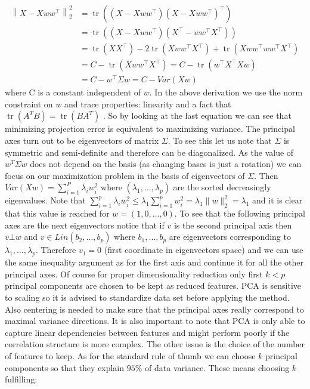 \documentclass[12pt, wide]{mwart}
\begin{document}
\begin{align*}
\left\|X-X w w^{\top}\right\|^{2}_2 &=\operatorname{tr}\left(\left(X-X w w^{\top}\right)\left(X-X w w^{\top}\right)^{\top}\right) \\ &=\operatorname{tr}\left(\left(X-X w w^{\top}\right)\left(X^{\top}-w w^{\top} X^{\top}\right)\right) \\ &=\operatorname{tr}\left(X X^{\top}\right)-2 \operatorname{tr}\left(X w w^{\top} X^{\top}\right)+\operatorname{tr}\left(X w w^{\top} w w^{\top} X^{\top}\right) \\ &=C-\operatorname{tr}\left(X w w^{\top} X^{\top}\right)=C-\operatorname{tr}\left(w^{\top} X^{\top} X w\right) \\ &=C-w^{\top} \Sigma w = C - Var(Xw)
\end{align*} where C is a constant independent of $w$. In the above derivation we use the norm constraint on $w$ and trace properties: linearity and a fact that $\operatorname{tr}\left(A^TB\right) = \operatorname{tr}\left(BA^T\right)$ . So by looking at the last equation we can see that minimizing projection error is equivalent to maximizing variance. The principal axes turn out to be eigenvectors of matrix $\Sigma$. To see this let us note that $\Sigma$ is symmetric and semi-definite and therefore can be diagonalized. As the value of $w^T\Sigma w$ does not depend on the basis (as changing bases is just a rotation) we can focus on our maximization problem in the basis of eigenvectors of $\Sigma$. Then $Var(Xw) = \sum_{i=1}^P \lambda_i w_i^2$ where $(\lambda_1, \ldots, \lambda_p)$ are the sorted decreasingly eigenvalues. Note that $\sum_{i=1}^p \lambda_i w_i^2 \leq \lambda_1 \sum_{i=1}^p w_i^2 = \lambda_1 \| w\|_2^2 = \lambda_1$ and it is clear that this value is reached for $w = (1, 0, \ldots, 0)$. To see that the following principal axes are the next eigenvectors notice that if $v$ is the second principal axis then $v \bot w$ and $v \in Lin(b_2, \ldots, b_p)$ where $b_1, \ldots, b_p$ are eigenvectors corresponding to $\lambda_1, \ldots, \lambda_p$. Therefore $v_1 = 0$ (first coordinate in eigenvectors space) and we can use the same inequality argument as for the first axis and continue it for all the other principal axes. Of course for proper dimensionality reduction only first $k < p$ principal components are chosen to be kept as reduced features. 
PCA is sensitive to scaling so it is advised to standardize data set before applying the method. Also centering is needed to make sure that the principal axes really correspond to maximal variance directions. It is also important to note that PCA is only able to capture linear dependencies between features and might perform poorly if the correlation structure is more complex. The other issue is the choice of the number of features to keep. As for the standard rule of thumb we can choose $k$ principal components so that they explain $95\%$ of data variance. These means choosing $k$ fulfilling:
\end{document}
